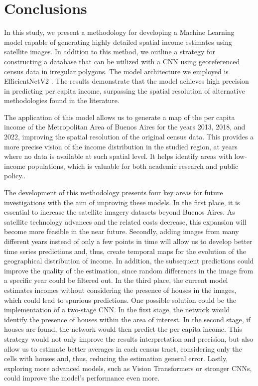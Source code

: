 \documentclass[conference]{IEEEtran}
\begin{document}
\section{Conclusions}\label{sec:conclusiones}

In this study, we present a methodology for developing a Machine Learning model capable of generating highly detailed spatial income estimates using satellite images. In addition to this method, we outline a strategy for constructing a database that can be utilized with a CNN using georeferenced census data in irregular polygons. The model architecture we employed is EfficientNetV2 \citep{EfficientNetV2}. The results demonstrate that the model achieves high precision in predicting per capita income, surpassing the spatial resolution of alternative methodologies found in the literature.

The application of this model allows us to generate a map of the per capita income of the Metropolitan Area of Buenos Aires for the years 2013, 2018, and 2022, improving the spatial resolution of the original census data. This provides a more precise vision of the income distribution in the studied region, at years where no data is available at such spatial level.  It helps identify areas with low-income populations, which is valuable for both academic research and public policy..

The development of this methodology presents four key areas for future investigations with the aim of improving these models. In the first place, it is essential to increase the satellite imagery datasets beyond Buenos Aires. As satellite technology advances and the related costs decrease, this expansion will become more feasible in the near future. Secondly, adding images from many different years instead of only a few points in time will allow us to develop better time series predictions and, thus, create temporal maps for the evolution of the geographical distribution of income. In addition, the subsequent predictions could improve the quality of the estimation, since random differences in the image from a specific year could be filtered out. In the third place, the current model estimates incomes without considering the presence of houses in the images, which could lead to spurious predictions. One possible solution could be the implementation of a two-stage CNN. In the first stage, the network would identify the presence of houses within the area of interest. In the second stage, if houses are found, the network would then predict the per capita income. This strategy would not only improve the results interpretation and precision, but also allow us to estimate better averages in each census tract, considering only the cells with houses and, thus, reducing the estimation general error. Lastly, exploring more advanced models, such as Vision Transformers or stronger CNNs, could improve the model’s performance even more.
\end{document}
